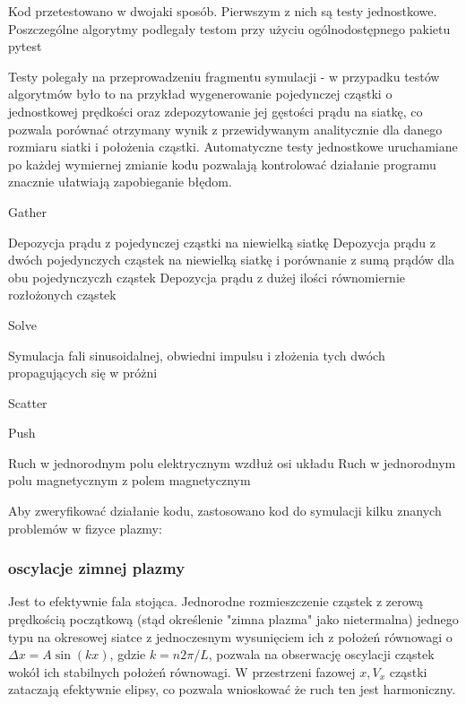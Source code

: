     Kod przetestowano w dwojaki sposób. Pierwszym z nich są testy jednostkowe.
    Poszczególne algorytmy podlegały testom przy użyciu ogólnodostępnego pakietu pytest %

    Testy polegały na przeprowadzeniu fragmentu symulacji - w przypadku testów algorytmów było to na przykład wygenerowanie
    pojedynczej cząstki o jednostkowej prędkości oraz zdepozytowanie jej gęstości prądu na siatkę, co pozwala porównać
    otrzymany wynik z przewidywanym analitycznie dla danego rozmiaru siatki i położenia cząstki. Automatyczne testy
    jednostkowe uruchamiane po każdej wymiernej zmianie kodu pozwalają kontrolować działanie programu znacznie ułatwiają
    zapobieganie błędom.

    \begin{enumerate}
        \itemi Gather
            \begin{enumerate}
                \itemii Depozycja prądu z pojedynczej cząstki na niewielką siatkę
                \itemii Depozycja prądu z dwóch pojedynczych cząstek na niewielką siatkę
                    i porównanie z sumą prądów dla obu pojedynczyczh cząstek
                \itemii Depozycja prądu z dużej ilości równomiernie rozłożonych cząstek
            \end{enumerate}

        \itemi Solve
            \begin{enumerate}
                \itemii Symulacja fali sinusoidalnej, obwiedni impulsu i złożenia tych dwóch
                    propagujących się w próżni
            \end{enumerate}

        \itemi Scatter
            \begin{enumerate}
                \itemii %
            \end{enumerate}

        \itemi Push
            \begin{enumerate}
                \itemii Ruch w jednorodnym polu elektrycznym wzdłuż osi układu
                \itemii Ruch w jednorodnym polu magnetycznym z polem magnetycznym
            \end{enumerate}
    \end{enumerate}

    Aby zweryfikować działanie kodu, zastosowano kod do symulacji kilku znanych problemów w fizyce plazmy:
    \subsubsection{oscylacje zimnej plazmy}
    Jest to efektywnie fala stojąca. Jednorodne rozmieszczenie cząstek z zerową prędkością początkową (stąd określenie
    "zimna plazma" jako nietermalna)
    jednego typu na okresowej siatce z jednoczesnym wysunięciem ich z położeń równowagi o $\Delta x = A \sin(kx)$,
    gdzie $k = n 2 \pi / L$, pozwala na obserwację
    oscylacji cząstek wokół ich stabilnych położeń równowagi. W przestrzeni fazowej $x, V_x$ cząstki zataczają efektywnie
    elipsy, co pozwala wnioskować że ruch ten jest harmoniczny.

